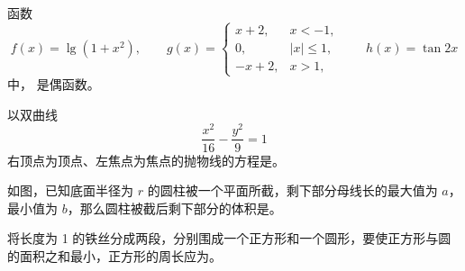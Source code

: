 \begin{question}
函数
\nopagebreak[4]
\[
    f(x)=\lg(1+x^2),\qquad
    g(x)=\begin{cases}
    x+2,&x<-1,\\
    0,&|x|\le 1,\\
    -x+2,&x>1,
    \end{cases}
    \qquad h(x)=\tan 2x
\]
    中，\gkblank{} 是偶函数。

\end{question}
\begin{question}
以双曲线
\nopagebreak[4]
\[
    \frac{x^2}{16}-\frac{y^2}{9}=1
\]
    右顶点为顶点、左焦点为焦点的抛物线的方程是\gkblank{}。

\Needspace{0.4\textheight}
\end{question}
\begin{question}
如图，已知底面半径为 \(r\) 的圆柱被一个平面所截，剩下部分母线长的最大值为 \(a\)，最小值为 \(b\)，那么圆柱被截后剩下部分的体积是\gkblank{}。
\nopagebreak[4]
\begin{center}\end{center}
\nopagebreak[4]
\end{question}
\begin{question}
将长度为 1 的铁丝分成两段，分别围成一个正方形和一个圆形，要使正方形与圆的面积之和最小，正方形的周长应为\gkblank{}。

\end{question}

